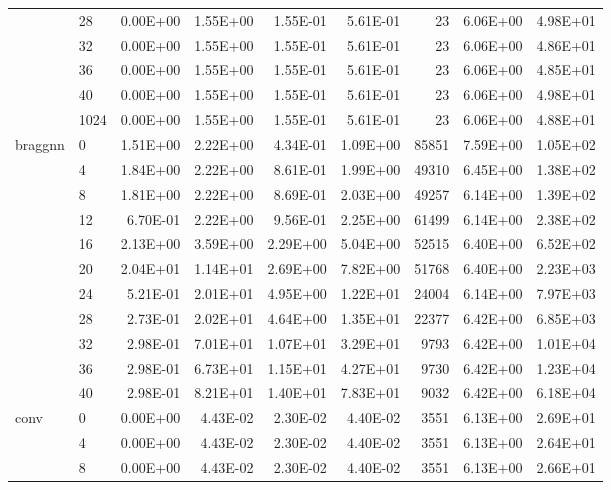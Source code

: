 \begin{longtable}{llrrrrrrr}
         & 28   &   0.00E+00 & 1.55E+00 & 1.55E-01 & 5.61E-01 &      23 &     6.06E+00 & 4.98E+01 \\
         & 32   &   0.00E+00 & 1.55E+00 & 1.55E-01 & 5.61E-01 &      23 &     6.06E+00 & 4.86E+01 \\
         & 36   &   0.00E+00 & 1.55E+00 & 1.55E-01 & 5.61E-01 &      23 &     6.06E+00 & 4.85E+01 \\
         & 40   &   0.00E+00 & 1.55E+00 & 1.55E-01 & 5.61E-01 &      23 &     6.06E+00 & 4.98E+01 \\
         & 1024 &   0.00E+00 & 1.55E+00 & 1.55E-01 & 5.61E-01 &      23 &     6.06E+00 & 4.88E+01 \\
braggnn & 0    &   1.51E+00 & 2.22E+00 & 4.34E-01 & 1.09E+00 &   85851 &     7.59E+00 & 1.05E+02 \\
         & 4    &   1.84E+00 & 2.22E+00 & 8.61E-01 & 1.99E+00 &   49310 &     6.45E+00 & 1.38E+02 \\
         & 8    &   1.81E+00 & 2.22E+00 & 8.69E-01 & 2.03E+00 &   49257 &     6.14E+00 & 1.39E+02 \\
         & 12   &   6.70E-01 & 2.22E+00 & 9.56E-01 & 2.25E+00 &   61499 &     6.14E+00 & 2.38E+02 \\
         & 16   &   2.13E+00 & 3.59E+00 & 2.29E+00 & 5.04E+00 &   52515 &     6.40E+00 & 6.52E+02 \\
         & 20   &   2.04E+01 & 1.14E+01 & 2.69E+00 & 7.82E+00 &   51768 &     6.40E+00 & 2.23E+03 \\
         & 24   &   5.21E-01 & 2.01E+01 & 4.95E+00 & 1.22E+01 &   24004 &     6.14E+00 & 7.97E+03 \\
         & 28   &   2.73E-01 & 2.02E+01 & 4.64E+00 & 1.35E+01 &   22377 &     6.42E+00 & 6.85E+03 \\
         & 32   &   2.98E-01 & 7.01E+01 & 1.07E+01 & 3.29E+01 &    9793 &     6.42E+00 & 1.01E+04 \\
         & 36   &   2.98E-01 & 6.73E+01 & 1.15E+01 & 4.27E+01 &    9730 &     6.42E+00 & 1.23E+04 \\
         & 40   &   2.98E-01 & 8.21E+01 & 1.40E+01 & 7.83E+01 &    9032 &     6.42E+00 & 6.18E+04 \\
conv & 0    &   0.00E+00 & 4.43E-02 & 2.30E-02 & 4.40E-02 &    3551 &     6.13E+00 & 2.69E+01 \\
         & 4    &   0.00E+00 & 4.43E-02 & 2.30E-02 & 4.40E-02 &    3551 &     6.13E+00 & 2.64E+01 \\
         & 8    &   0.00E+00 & 4.43E-02 & 2.30E-02 & 4.40E-02 &    3551 &     6.13E+00 & 2.66E+01 \\

\end{longtable}
